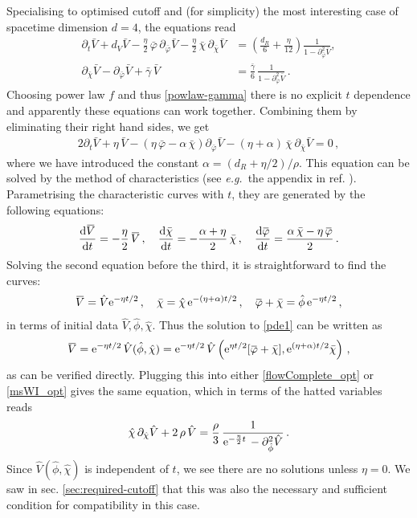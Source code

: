 \documentclass[11pt]{book} %
\newcommand{\overbar}[1]{\mkern 1.5mu\overline{\mkern-1.5mu#1\mkern-1.5mu}\mkern 1.5mu}
\newcommand{\bV}{\overbar V}
\newcommand{\bp}{\overbar \varphi}
\newcommand\eg{\textit{e.g.}\ }
\newcommand{\bc}{\bar \chi}
\newcommand{\hV}{\hat V}
\newcommand{\hp}{\hat \phi}
\newcommand{\hc}{\hat \chi}
\numberwithin{equation}{chapter}
\begin{document}
Specialising to optimised cutoff and (for simplicity) the most interesting case of spacetime dimension $d=4$,
the equations read
\begin{align}
  \label{flowComplete_opt}
  \partial_t\bar{V}+
  d_V \bar V - \frac{\eta}{2} \, \bar \varphi \, \partial_{\bar\varphi}\bar V -\frac{\eta}{2} \, \bar \chi \, \partial_{\bar\chi}\bar V &= \left(  \frac{d_R}{6} + \frac{\eta}{12} \right) \frac{1}{1 -  \partial^2_{\bar\varphi}\bar V},\\
  \label{msWI_opt}
  \partial_{\bar\chi}\bar V - \partial_{\bar\varphi}\bar V + \bar{\gamma} \, \bar V &= \frac{\bar{\gamma}}{6} \, \frac{1}{1 - \partial^2_{\bar\varphi}\bar V}\,.
\end{align}
Choosing power law $f$ and thus \eqref{powlaw-gamma} there is no explicit $t$ dependence and apparently
these equations can work together. Combining them by eliminating their right hand sides, we get
\begin{align}
  \label{pde1}
  2\partial_t\bar{V}+\eta \, \bar{V}-\left(\eta \, \bar\varphi-\alpha \, \bc\right)\partial_{\bar{\varphi}}\bar{V}-(\eta+\alpha) \, \bar\chi \, \partial_{\bar{\chi}} \bar{V}=0\,,
\end{align}
where we have introduced the constant $\alpha = (d_R+\eta/2)/\rho$.
This equation can be solved by the method of characteristics
(see \eg the appendix in ref. \cite{Dietz:2015owa}). Parametrising the characteristic curves with $t$, they are generated by the following equations:
\begin{align}
  \frac{\mathrm d\bV}{\mathrm dt} = -\frac{\eta}{2} \, \bV\,,
  \quad
  \frac{\mathrm d\bc}{\mathrm dt}=-\frac{\alpha+\eta}{2} \, \bc\,,
  \quad
  \frac{\mathrm d\bp}{\mathrm dt}=\frac{\alpha\,\bc-\eta\,\bp}{2}\,.
\end{align}
Solving the second equation before the third, it is straightforward to find the curves:
\begin{align}
  \bV = \hV {\rm e}^{-\eta t/2}\,,\quad \bc = \hc\, {\rm e}^{-(\eta+\alpha)t/2}\,,\quad \bp+\bc = \hp\, {\rm e}^{-\eta t/2}\,,
\end{align}
in terms of initial data $\hV,\hp,\hc$.
Thus the solution to \eqref{pde1} can be written as
\begin{align}
  \bV ={\rm e}^{-\eta t/2}\, \hV(\hp,\hc) ={\rm e}^{-\eta t/2} \,\hV\left({\rm e}^{\eta t/2}[\bp+\bc],{\rm e}^{(\eta+\alpha)t/2}\bc\right)\,,
\end{align}
as can be verified directly. Plugging this into either \eqref{flowComplete_opt} or \eqref{msWI_opt}
gives the same equation, which in terms of the hatted variables reads
\begin{align}
  \hc \, \partial_{\hc}\hV + 2 \, \rho \, \hV = \frac{\rho}{3} \, \frac{1}{{\rm e}^{-\frac{\eta}{2} t} \,-\partial^2_{\hp}\hV}\,.
\end{align}
Since $\hV(\hp,\hc)$ is independent of $t$, we see there are no solutions unless $\eta=0$.
We saw in sec. \ref{sec:required-cutoff} that this was also the necessary and sufficient condition for
compatibility in this case.
\end{document}
